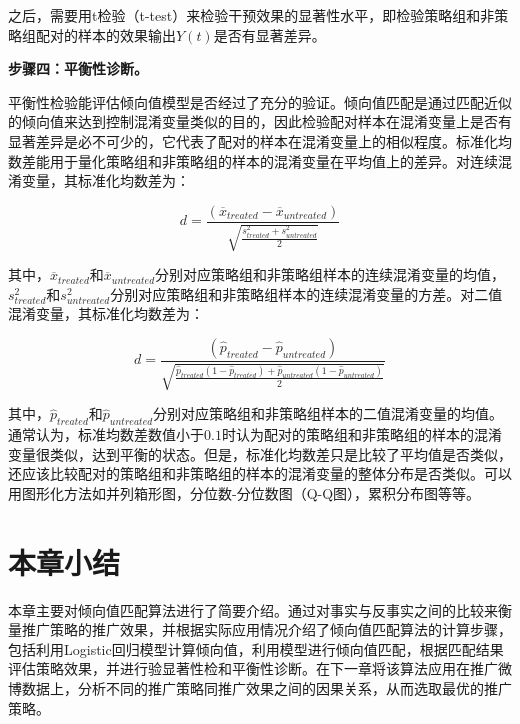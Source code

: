 之后，需要用t检验（t-test）来检验干预效果的显著性水平，即检验策略组和非策略组配对的样本的效果输出$Y(t)$是否有显著差异。

\textbf{步骤四：平衡性诊断。}

平衡性检验能评估倾向值模型是否经过了充分的验证。倾向值匹配是通过匹配近似的倾向值来达到控制混淆变量类似的目的，因此检验配对样本在混淆变量上是否有显著差异是必不可少的，它代表了配对的样本在混淆变量上的相似程度。标准化均数差能用于量化策略组和非策略组的样本的混淆变量在平均值上的差异。对连续混淆变量，其标准化均数差为：

\begin{equation}
d = \frac{(\overline{x}_{treated} - \overline{x}_{untreated})}{\sqrt{\frac{s_{treated}^2 + s_{untreated}^2}{2}}}
\end{equation}

其中，$\overline{x}_{treated}$和$\overline{x}_{untreated}$分别对应策略组和非策略组样本的连续混淆变量的均值， $s_{treated}^2$和$s_{untreated}^2$分别对应策略组和非策略组样本的连续混淆变量的方差。对二值混淆变量，其标准化均数差为：

\begin{equation}d = \frac{(\hat{p}_{treated} - \hat{p}_{untreated})}{\sqrt{\frac{\hat{p}_{treated}(1 - \hat{p}_{treated}) + \hat{p}_{untreated}(1 - \hat{p}_{untreated})}{2}}}\end{equation}

其中，$\hat{p}_{treated}$和$\hat{p}_{untreated}$分别对应策略组和非策略组样本的二值混淆变量的均值。通常认为，标准均数差数值小于$0.1$时认为配对的策略组和非策略组的样本的混淆变量很类似，达到平衡的状态\cite{Normand 2001}。但是，标准化均数差只是比较了平均值是否类似，还应该比较配对的策略组和非策略组的样本的混淆变量的整体分布是否类似。可以用图形化方法如并列箱形图，分位数-分位数图（Q-Q图），累积分布图等等。

\section{本章小结}

本章主要对倾向值匹配算法进行了简要介绍。通过对事实与反事实之间的比较来衡量推广策略的推广效果，并根据实际应用情况介绍了倾向值匹配算法的计算步骤，包括利用Logistic回归模型计算倾向值，利用模型进行倾向值匹配，根据匹配结果评估策略效果，并进行验显著性检和平衡性诊断。在下一章将该算法应用在推广微博数据上，分析不同的推广策略同推广效果之间的因果关系，从而选取最优的推广策略。






















